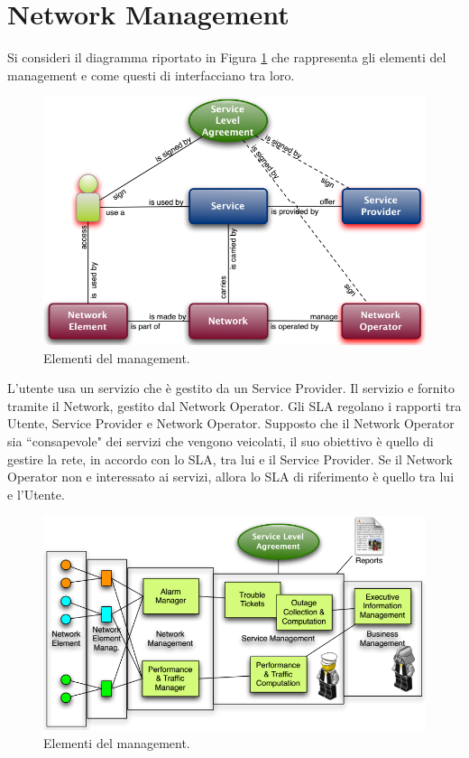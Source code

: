 \section{Network Management}
Si consideri il diagramma riportato in Figura \ref{img:management-elements} che rappresenta gli elementi del management e come questi di interfacciano tra loro.
\begin{figure}[htbp]
	\centering
	\includegraphics[scale = 0.55]{images/management-elements}
	\caption{Elementi del management.}
	\label{img:management-elements}
\end{figure}
L'utente usa un servizio che è gestito da un Service Provider. Il servizio e fornito tramite il Network, gestito dal Network Operator. Gli SLA regolano i rapporti tra Utente, Service Provider e Network Operator. Supposto che il Network Operator sia \textquotedblleft consapevole" dei servizi che vengono veicolati, il suo obiettivo è quello di gestire la rete, in accordo con lo SLA, tra lui e il Service Provider. Se il Network Operator non e interessato ai servizi, allora lo SLA di riferimento è quello tra lui e l'Utente.
\begin{figure}[htbp]
	\centering
	\includegraphics[scale = 0.55]{images/management-elements-1}
	\caption{Elementi del management.}
	\label{img:management-elements-1}
\end{figure}\\
